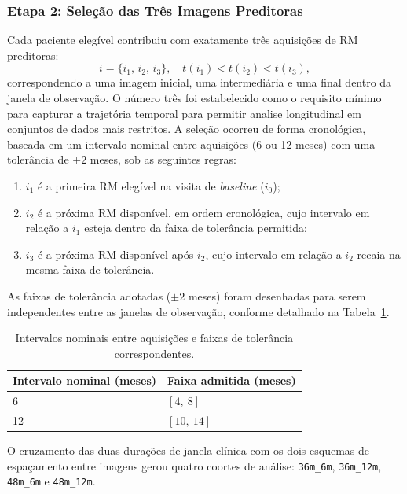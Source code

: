 \documentclass[review]{elsarticle}
\newcommand{\code}[1]{\texttt{#1}}
\begin{document}
	\subsubsection{Etapa 2: Seleção das Três Imagens Preditoras}
	Cada paciente elegível contribuiu com exatamente três aquisições de RM preditoras:
	\begin{equation}
		i=\{i_1,\,i_2,\,i_3\},
		\quad t(i_1)<t(i_2)<t(i_3),
	\end{equation}
	correspondendo a uma imagem inicial, uma intermediária e uma final dentro da janela de observação. O número três foi estabelecido como o requisito mínimo para capturar a trajetória temporal para permitir analise longitudinal em conjuntos de dados mais restritos. A seleção ocorreu de forma cronológica, baseada em um intervalo nominal entre aquisições (6 ou 12 meses) com uma tolerância de $\pm 2$ meses, sob as seguintes regras:
	
	\begin{enumerate}
		\item $i_1$ é a primeira RM elegível na visita de \textit{baseline} ($i_0$);
		\item $i_2$ é a próxima RM disponível, em ordem cronológica, cujo intervalo em relação a $i_1$ esteja dentro da faixa de tolerância permitida;
		\item $i_3$ é a próxima RM disponível após $i_2$, cujo intervalo em relação a $i_2$ recaia na mesma faixa de tolerância.
	\end{enumerate}
	
	As faixas de tolerância adotadas ($\pm 2$ meses) foram desenhadas para serem independentes entre as janelas de observação, conforme detalhado na Tabela~\ref{tab:bandas}.
	
	\begin{table}[H]
		\centering
		\caption{Intervalos nominais entre aquisições e faixas de tolerância correspondentes.}
		\label{tab:bandas}
		\begin{tabular}{ll}
			\toprule
			Intervalo nominal (meses) & Faixa admitida (meses) \\
			\midrule
			6  & $[4,\ 8]$ \\
			12 & $[10,\ 14]$ \\
			\bottomrule
		\end{tabular}
	\end{table}
	
	O cruzamento das duas durações de janela clínica com os dois esquemas de espaçamento entre imagens gerou quatro coortes de análise: \code{36m\_6m}, \code{36m\_12m}, \code{48m\_6m} e \code{48m\_12m}.
	
\end{document}
